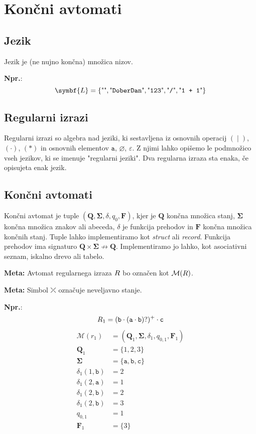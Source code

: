 \documentclass{report}
\newcommand{\Ex}{\textbf{Npr.}:\ }
\newcommand{\Special}[1]{\textbf{#1}}
\newcommand{\Empty}{\varnothing}
\newcommand{\Null}{\varepsilon}
\newcommand{\Automaton}[1]{\mathcal{M}(#1)}
\newcommand{\Str}[1]{\text{\textquotedbl\texttt{#1}\textquotedbl}}
\newcommand{\Char}[1]{\texttt{#1}}
\newcommand{\Seq}{\cdot}
\newcommand{\Union}{\mathrel{|}}
\newcommand{\KleenePlus}[1]{#1^+}
\newcommand{\Err}{\rdiagovfdiag}
\newcommand{\Set}[1]{\symbf{#1}}
\newcommand{\Alphabet}{\Set{\Sigma}}
\newlength{\arrow}
\newcommand{\RE}[1]{{\uppercase{#1}}}
\begin{document}
\chapter{Končni avtomati}

\section{Jezik}
Jezik je (ne nujno končna) množica nizov.

\Ex
\begin{equation*}
  \Set{L} = \{\Str{}, \Str{DoberDan}, \Str{123}, \Str{/}, \Str{1 + 1} \}
\end{equation*}

\section{Regularni izrazi}
Regularni izrazi so algebra nad jeziki, ki sestavljena iz osnovnih operacij $(\Union)$, $(\Seq)$, $(\ast)$ in osnovnih elementov $\Char{a}$, $\Empty$, $\Null$.
Z njimi lahko opišemo le podmnožico vseh jezikov, ki se imenuje "regularni jeziki".
Dva regularna izraza sta enaka, če opisujeta enak jezik.



\section{Končni avtomati}

Končni avtomat je tuple $(\Set{Q}, \Alphabet, \delta, q_0, \Set{F})$, kjer je $\Set{Q}$ končna množica stanj, $\Alphabet$ končna množica znakov ali abeceda, $\delta$ je funkcija prehodov in $\Set{F}$ končna množica končnih stanj.
Tuple lahko implementiramo kot \emph{struct} ali \emph{record}.
Funkcija prehodov ima signaturo $\Set{Q} \times \Alphabet \not\rightarrow \Set{Q}$.
Implementiramo jo lahko, kot asociativni seznam, iskalno drevo ali tabelo.

\Special{Meta:} Avtomat regularnega izraza $\RE{r}$ bo označen kot $\Automaton{\RE{r}}$.

\Special{Meta:} Simbol $\Err$ označuje neveljavno stanje.

\Ex
\begin{equation}
  \RE{r}_1 = \KleenePlus{(\Char{b} \Seq (\Char{a} \Seq \Char{b})?)} \Seq \Char{c} \\
\end{equation}
\begin{align*}
  \Automaton{r_1} &= (\Set{Q}_1, \Alphabet, \delta_1, q_{0, 1}, \Set{F}_1)\\[1em]
  \Set{Q}_1 &= \{1, 2, 3\} \\[1em]
  \Alphabet &= \{\Char{a}, \Char{b}, \Char{c}\} \\[1em]
  \delta_1(1, \Char{b}) & =  2\\
  \delta_1(2, \Char{a}) & =  1\\
  \delta_1(2, \Char{b}) & =  2\\
  \delta_1(2, \Char{b}) & =  3\\[1em]
  q_{0, 1} &= 1 \\[1em]
  \Set{F}_1 &= \{3\}
\end{align*}
\end{document}
